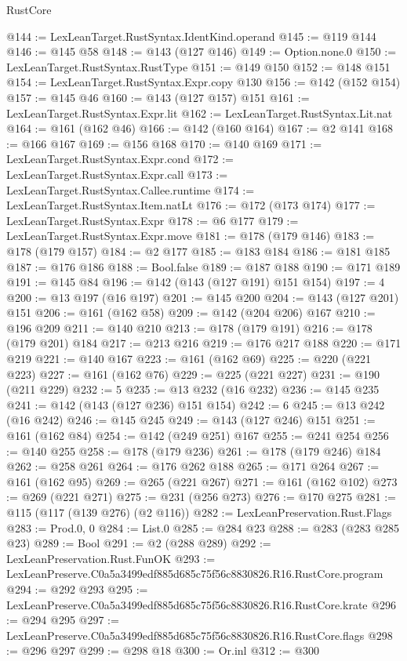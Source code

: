 \begin{lexlean}{RustCore}
\begin{coremodule}
@144 := LexLeanTarget.RustSyntax.IdentKind.operand
@145 := @119 @144
@146 := @145 @58
@148 := @143 (@127 @146)
@149 := Option.none.{0}
@150 := LexLeanTarget.RustSyntax.RustType
@151 := @149 @150
@152 := @148 @151
@154 := LexLeanTarget.RustSyntax.Expr.copy @130
@156 := @142 (@152 @154)
@157 := @145 @46
@160 := @143 (@127 @157) @151
@161 := LexLeanTarget.RustSyntax.Expr.lit
@162 := LexLeanTarget.RustSyntax.Lit.nat
@164 := @161 (@162 @46)
@166 := @142 (@160 @164)
@167 := @2 @141
@168 := @166 @167
@169 := @156 @168
@170 := @140 @169
@171 := LexLeanTarget.RustSyntax.Expr.cond
@172 := LexLeanTarget.RustSyntax.Expr.call
@173 := LexLeanTarget.RustSyntax.Callee.runtime
@174 := LexLeanTarget.RustSyntax.Item.natLt
@176 := @172 (@173 @174)
@177 := LexLeanTarget.RustSyntax.Expr
@178 := @6 @177
@179 := LexLeanTarget.RustSyntax.Expr.move
@181 := @178 (@179 @146)
@183 := @178 (@179 @157)
@184 := @2 @177
@185 := @183 @184
@186 := @181 @185
@187 := @176 @186
@188 := Bool.false
@189 := @187 @188
@190 := @171 @189
@191 := @145 @84
@196 := @142 (@143 (@127 @191) @151 @154)
@197 := 4
@200 := @13 @197 (@16 @197)
@201 := @145 @200
@204 := @143 (@127 @201) @151
@206 := @161 (@162 @58)
@209 := @142 (@204 @206) @167
@210 := @196 @209
@211 := @140 @210
@213 := @178 (@179 @191)
@216 := @178 (@179 @201) @184
@217 := @213 @216
@219 := @176 @217 @188
@220 := @171 @219
@221 := @140 @167
@223 := @161 (@162 @69)
@225 := @220 (@221 @223)
@227 := @161 (@162 @76)
@229 := @225 (@221 @227)
@231 := @190 (@211 @229)
@232 := 5
@235 := @13 @232 (@16 @232)
@236 := @145 @235
@241 := @142 (@143 (@127 @236) @151 @154)
@242 := 6
@245 := @13 @242 (@16 @242)
@246 := @145 @245
@249 := @143 (@127 @246) @151
@251 := @161 (@162 @84)
@254 := @142 (@249 @251) @167
@255 := @241 @254
@256 := @140 @255
@258 := @178 (@179 @236)
@261 := @178 (@179 @246) @184
@262 := @258 @261
@264 := @176 @262 @188
@265 := @171 @264
@267 := @161 (@162 @95)
@269 := @265 (@221 @267)
@271 := @161 (@162 @102)
@273 := @269 (@221 @271)
@275 := @231 (@256 @273)
@276 := @170 @275
@281 := @115 (@117 (@139 @276) (@2 @116))
@282 := LexLeanPreservation.Rust.Flags
@283 := Prod.{0, 0}
@284 := List.{0}
@285 := @284 @23
@288 := @283 (@283 @285 @23)
@289 := Bool
@291 := @2 (@288 @289)
@292 := LexLeanPreservation.Rust.FunOK
@293 := LexLeanPreserve.C0a5a3499edf885d685c75f56c8830826.R16.RustCore.program
@294 := @292 @293
@295 := LexLeanPreserve.C0a5a3499edf885d685c75f56c8830826.R16.RustCore.krate
@296 := @294 @295
@297 := LexLeanPreserve.C0a5a3499edf885d685c75f56c8830826.R16.RustCore.flags
@298 := @296 @297
@299 := @298 @18
@300 := Or.inl
@312 := @300

\end{coremodule}
\end{lexlean}
